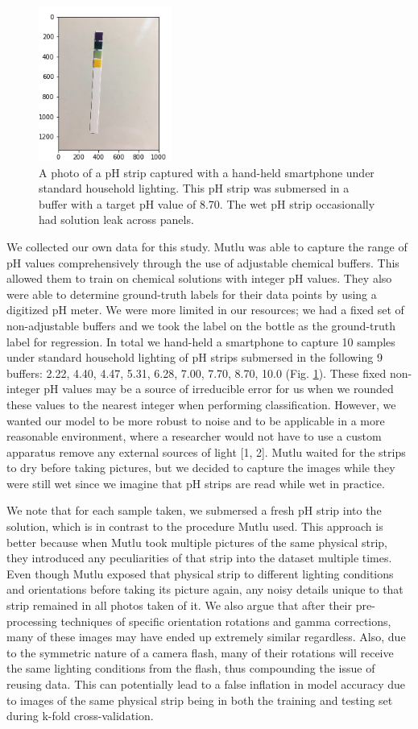 \documentclass[journal]{IEEEtran}
\begin{document}
\begin{figure}
\centering
\includegraphics[height=2in]{raw8p70_07.png}
\caption{A photo of a pH strip captured with a hand-held smartphone under standard household lighting. This pH strip was submersed in a buffer with a target pH value of 8.70. The wet pH strip occasionally had solution leak across panels.}
\label{raw_photo}
\end{figure}

We collected our own data for this study. Mutlu was able to capture the range of pH values comprehensively through the use of adjustable chemical buffers. This allowed them to train on chemical solutions with integer pH values. They also were able to determine ground-truth labels for their data points by using a digitized pH meter. We were more limited in our resources; we had a fixed set of non-adjustable buffers and we took the label on the bottle as the ground-truth label for regression. In total we hand-held a smartphone to capture 10 samples under standard household lighting of pH strips submersed in the following 9 buffers: 2.22, 4.40, 4.47, 5.31, 6.28, 7.00, 7.70, 8.70, 10.0 (Fig. \ref{raw_photo}). These fixed non-integer pH values may be a source of irreducible error for us when we rounded these values to the nearest integer when performing classification. However, we wanted our model to be more robust to noise and to be applicable in a more reasonable environment, where a researcher would not have to use a custom apparatus remove any external sources of light [1, 2]. Mutlu waited for the strips to dry before taking pictures, but we decided to capture the images while they were still wet since we imagine that pH strips are read while wet in practice.

We note that for each sample taken, we submersed a fresh pH strip into the solution, which is in contrast to the procedure Mutlu used. This approach is better because when Mutlu took multiple pictures of the same physical strip, they introduced any peculiarities of that strip into the dataset multiple times. Even though Mutlu exposed that physical strip to different lighting conditions and orientations before taking its picture again, any noisy details unique to that strip remained in all photos taken of it. We also argue that after their pre-processing techniques of specific orientation rotations and gamma corrections, many of these images may have ended up extremely similar regardless. Also, due to the symmetric nature of a camera flash, many of their rotations will receive the same lighting conditions from the flash, thus compounding the issue of reusing data. This can potentially lead to a false inflation in model accuracy due to images of the same physical strip being in both the training and testing set during k-fold cross-validation.
\end{document}
